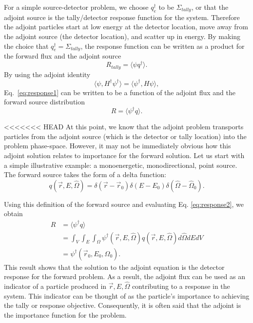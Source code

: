 For a simple source-detector problem, we choose
$q_{e}^{\dagger}$ to be $\Sigma_{tally}$, or that the adjoint source is the
tally/detector response function
for the system. Therefore the adjoint particles start at low energy at the detector
location, move away from the adjoint source (the detector location), and scatter
up in energy.
 By making the choice that $q_{e}^{\dagger} = \Sigma_{tally}$, the
response function can be written as a product for the forward flux and the
adjoint source
\begin{equation}
  R_{tally} = \langle \psi q^{\dagger} \rangle .
  \label{eq:response1}
\end{equation}
By using the adjoint identity 
\begin{equation}
  \langle \psi, H^{\dagger} \psi^{\dagger} \rangle =
  \langle \psi^{\dagger}, H \psi \rangle ,
\end{equation}
Eq.\ \eqref{eq:response1} can be written to be a function of the
adjoint flux and the forward source distribution
\begin{equation}
  R = \langle \psi^{\dagger} q \rangle .
  \label{eq:response2}
\end{equation}

<<<<<<< HEAD
At this point, we know that the adjoint problem transports particles from the adjoint source (which is the detector or tally
location) into the problem phase-space. However, it may not be immediately obvious how this adjoint solution
relates to importance for the forward solution. Let us start with a simple
illustrative example: a monoenergetic, monodirectional, point source. The
forward source takes the form of a delta function:
\begin{equation*}
  q(\vec{r}, E, \hat{\Omega}) = \delta(\vec{r}-\vec{r}_0) \delta(E-E_0)
  \delta(\hat{\Omega}-\hat{\Omega}_0) .
\end{equation*}

Using this definition of the forward source and evaluating Eq.
\eqref{eq:response2}, we obtain
\begin{equation*}
  \begin{split}
    R &= \langle \psi^{\dagger} q \rangle \\
    &= \int_{V} \int_{E} \int_{\Omega} \psi^{\dagger}(\vec{r}, E, \hat{\Omega})
       q(\vec{r}, E, \hat{\Omega}) d\hat\Omega dE dV \\
       & = \psi^{\dagger}(\vec{r}_0, E_0, \hat{\Omega}_0).
\end{split}
\end{equation*}
This result shows that the solution to the adjoint equation is the detector
response for the forward problem. As a result, the adjoint flux can be used as
an indicator of a particle produced in $\vec{r}, E, \hat{\Omega}$ contributing
to a response in the system. This indicator can be thought of as the particle's
importance to achieving the tally or response objective. Consequently, it is
often said that the adjoint is the importance function for the problem.


